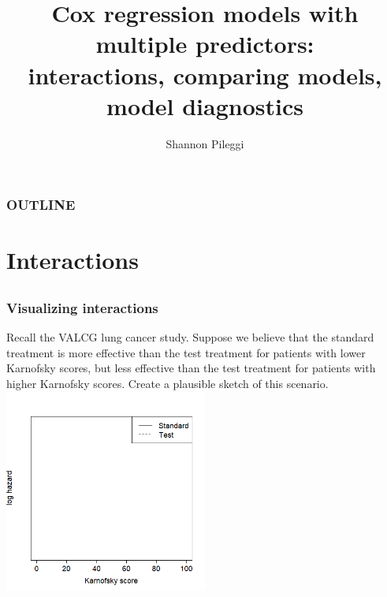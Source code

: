 



\title[Set 11]{Cox regression models with multiple predictors:\\ interactions, comparing models, model diagnostics}
\author[Pileggi]{Shannon Pileggi}


\date{}




\begin{frame}
\titlepage
\end{frame}

\begin{frame}
\frametitle{OUTLINE\qquad\qquad\qquad} \tableofcontents[hideallsubsections]
\end{frame}


\section[Interactions]{Interactions}
\subsection{}

\begin{frame}
\frametitle{Visualizing interactions}
Recall the VALCG lung cancer study.  Suppose we believe that the standard treatment is more effective than the test treatment for patients with lower Karnofsky scores, but less effective than the test treatment for patients with higher Karnofsky scores.  Create a plausible sketch of this scenario.\\
\includegraphics[width=0.5\textwidth]{Figures/blank_interaction.png}
\end{frame}


